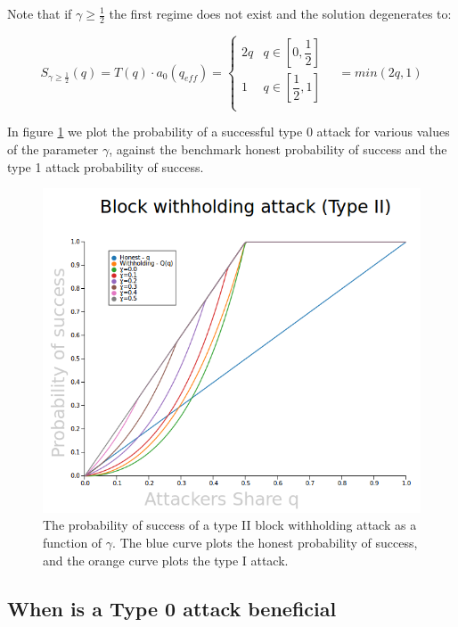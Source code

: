 \documentclass[letterpaper,12pt]{report}
\theoremstyle{plain}
\theoremstyle{definition}
\begin{document}
Note that if $\gamma\geq\frac{1}{2}$ the first regime does not exist and the solution degenerates to:

\begin{equation}\label{sofq2}
S_{\gamma\geq\frac{1}{2}}(q)=T(q)\cdot a_0(q_{eff})=
\begin{cases}
2q & q\in [0,\dfrac{1}{2}] \\ 
1 & q\in [\dfrac{1}{2},1] \\ 
\end{cases} \quad = min(2q,1)
\end{equation}

In figure \ref{fig:type0pos} we plot the probability of a successful type 0 attack for various values of the parameter $\gamma$, against the benchmark honest probability of success and the type 1 attack probability of success.


\begin{figure}[blockwithholdingtype2]
\centering
\includegraphics[width=150mm]{type2.png}
\caption{The probability of success of a type II block withholding attack as a function of $\gamma$. The blue curve plots the honest probability of success, and the orange curve plots the type I attack.}
\label{fig:type0pos}
\end{figure}

\subsection{When is a Type 0 attack beneficial}
\end{document}
